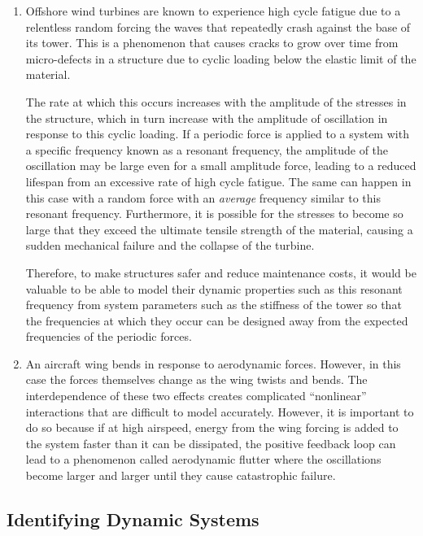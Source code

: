 \documentclass[12pt]{article}
\begin{document}
\begin{enumerate}[listparindent=\parindent]
        \item Offshore wind turbines are known to experience high cycle fatigue due to a relentless random forcing the waves that repeatedly crash against the base of its tower.
        This is a phenomenon that causes cracks to grow over time from micro-defects in a structure due to cyclic loading below the elastic limit of the material.

        The rate at which this occurs increases with the amplitude of the stresses in the structure, which in turn increase with the amplitude of oscillation in response to this cyclic loading.
        If a periodic force is applied to a system with a specific frequency known as a resonant frequency, the amplitude of the oscillation may be large even for a small amplitude force, leading to a reduced lifespan from an excessive rate of high cycle fatigue.
        The same can happen in this case with a random force with an \textit{average} frequency similar to this resonant frequency.
        Furthermore, it is possible for the stresses to become so large that they exceed the ultimate tensile strength of the material, causing a sudden mechanical failure and the collapse of the turbine.

        Therefore, to make structures safer and reduce maintenance costs, it would be valuable to be able to model their dynamic properties such as this resonant frequency from system parameters such as the stiffness of the tower so that the frequencies at which they occur can be designed away from the expected frequencies of the periodic forces.

        \item An aircraft wing bends in response to aerodynamic forces.
        However, in this case the forces themselves change as the wing twists and bends.
        The interdependence of these two effects creates complicated ``nonlinear'' interactions that are difficult to model accurately.
        However, it is important to do so because if at high airspeed, energy from the wing forcing is added to the system faster than it can be dissipated, the positive feedback loop can lead to a phenomenon called aerodynamic flutter where the oscillations become larger and larger until they cause catastrophic failure.
    \end{enumerate}

    \subsection{Identifying Dynamic Systems}
\end{document}
